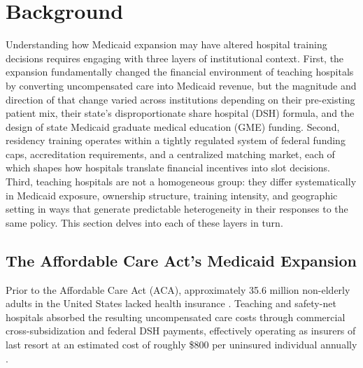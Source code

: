 \section{Background}\label{sec:background}

Understanding how Medicaid expansion may have altered hospital training decisions requires engaging with three layers of institutional context. First, the expansion fundamentally changed the financial environment of teaching hospitals by converting uncompensated care into Medicaid revenue, but the magnitude and direction of that change varied across institutions depending on their pre-existing patient mix, their state's disproportionate share hospital (DSH) formula, and the design of state Medicaid graduate medical education (GME) funding. Second, residency training operates within a tightly regulated system of federal funding caps, accreditation requirements, and a centralized matching market, each of which shapes how hospitals translate financial incentives into slot decisions. Third, teaching hospitals are not a homogeneous group: they differ systematically in Medicaid exposure, ownership structure, training intensity, and geographic setting in ways that generate predictable heterogeneity in their responses to the same policy. This section delves into each of these layers in turn.

\subsection{The Affordable Care Act's Medicaid Expansion}\label{sec:aca}

Prior to the Affordable Care Act (ACA), approximately 35.6 million non-elderly adults in the United States lacked health insurance \autocite{vistnes2019}. Teaching and safety-net hospitals absorbed the resulting uncompensated care costs through commercial cross-subsidization and federal DSH payments, effectively operating as insurers of last resort at an estimated cost of roughly \$800 per uninsured individual annually \autocite{garthwaite2018, lewin2000}.


